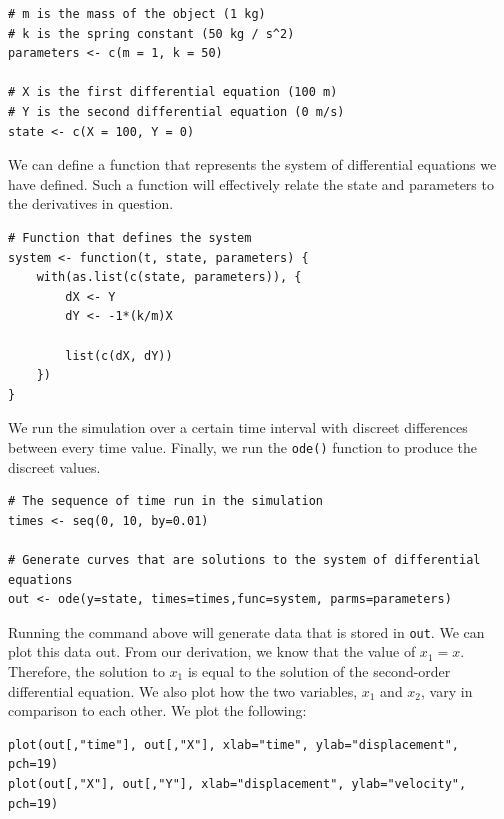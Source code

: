 \begin{lstlisting}
# m is the mass of the object (1 kg)
# k is the spring constant (50 kg / s^2)
parameters <- c(m = 1, k = 50)

# X is the first differential equation (100 m)
# Y is the second differential equation (0 m/s)
state <- c(X = 100, Y = 0)
\end{lstlisting}

We can define a function that represents the system of differential equations we have defined.
Such a function will effectively relate the state and parameters to the derivatives in question. 

\begin{lstlisting}
# Function that defines the system
system <- function(t, state, parameters) {
    with(as.list(c(state, parameters)), {
        dX <- Y
        dY <- -1*(k/m)X
        
        list(c(dX, dY))
    })
}
\end{lstlisting}

We run the simulation over a certain time interval with discreet differences between every time value.
Finally, we run the \texttt{ode()} function to produce the discreet values.

\begin{lstlisting}
# The sequence of time run in the simulation
times <- seq(0, 10, by=0.01)

# Generate curves that are solutions to the system of differential equations
out <- ode(y=state, times=times,func=system, parms=parameters)
\end{lstlisting}

Running the command above will generate data that is stored in \texttt{out}.
We can plot this data out.
From our derivation, we know that the value of $x_1=x$.
Therefore, the solution to $x_1$ is equal to the solution of the second-order differential equation.
We also plot how the two variables, $x_1$ and $x_2$, vary in comparison to each other.
We plot the following:

\begin{lstlisting}
plot(out[,"time"], out[,"X"], xlab="time", ylab="displacement", pch=19)
plot(out[,"X"], out[,"Y"], xlab="displacement", ylab="velocity", pch=19)
\end{lstlisting}

